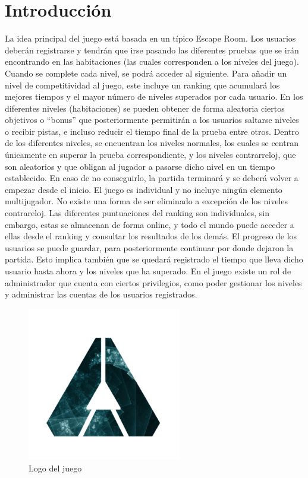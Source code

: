 \section{Introducción}\label{sec:intro}


La idea principal del juego está basada en un típico Escape Room. Los usuarios deberán registrarse y tendrán que irse pasando las diferentes pruebas que se irán encontrando en las habitaciones (las cuales corresponden a los niveles del juego). Cuando se complete cada nivel, se podrá acceder al siguiente. Para añadir un nivel de competitividad al juego, este incluye un ranking que acumulará los mejores tiempos y el mayor número de niveles superados por cada usuario. En los diferentes niveles (habitaciones) se pueden obtener de forma aleatoria ciertos objetivos o “bonus” que posteriormente permitirán a los usuarios saltarse niveles o recibir pistas, e incluso reducir el tiempo final de la prueba entre otros.
Dentro de los diferentes niveles, se encuentran los niveles normales, los cuales se centran únicamente en superar la prueba correspondiente, y los niveles contrarreloj, que son aleatorios y que obligan al jugador a pasarse dicho nivel en un tiempo establecido. En caso de no conseguirlo, la partida terminará y se deberá volver a empezar desde el inicio.
El juego es individual y no incluye ningún elemento multijugador.
No existe una forma de ser eliminado a excepción de los niveles contrareloj. 
Las diferentes puntuaciones del ranking son individuales, sin embargo, estas se almacenan de forma online, y todo el mundo puede acceder a ellas desde el ranking y consultar los resultados de los demás. 
El progreso de los usuarios se puede guardar, para posteriormente continuar por donde dejaron la partida. Esto implica también que se quedará registrado el tiempo que lleva dicho usuario hasta ahora y los niveles que ha superado.
En el juego existe un rol de administrador que cuenta con ciertos privilegios, como poder gestionar los niveles y administrar las cuentas de los usuarios registrados.


\begin{figure}[ht]
  \centering
  \includegraphics[width=0.6\textwidth]{./imatges/logo.png}
  \caption{Logo del juego}
  \label{fig:gamelogo}
\end{figure}
